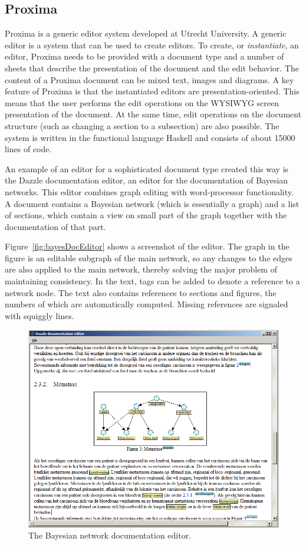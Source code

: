\documentclass[10pt]{article}
\begin{document}
\subsection{Proxima}

Proxima is a generic editor system developed at Utrecht University. A generic editor is a system that can be used to create editors. To create, or {\em instantiate}, an editor, Proxima needs to be provided with a document type and a number of sheets that describe the presentation of the document and the edit behavior. The content of a Proxima document can be mixed text, images and diagrams. A key feature of Proxima is that the instantiated editors are presentation-oriented. This means that the user performs the edit operations on the WYSIWYG screen presentation of the document. At the same time, edit operations on the document structure (such as changing a section to a subsection) are also possible. The system is written in the functional language Haskell and consists of about 15000 lines of code.

An example of an editor for a sophisticated document type created this way is the Dazzle documentation editor, an editor for the documentation of Bayesian networks. This editor combines graph editing with word-processor functionality. A document contains a Bayesian network (which is essentially a graph) and a list of sections, which contain a view on small part of the graph together with the documentation of that part. 

Figure~\ref{fig:bayesDocEditor} shows a screenshot of the editor. The graph in the figure is an editable subgraph of the main network, so any changes to the edges are also applied to the main network, thereby solving the major problem of maintaining consistency. In the text, tags can be added to denote a reference to a network node. The text also contains references to sections and figures, the numbers of which are automatically computed. Missing references are signaled with squiggly lines.

\begin{figure}[t]
\includegraphics[width=12cm]{images/subgraph}
\caption{The Bayesian network documentation editor.}
\label{fig:levelsAndLayers}
\end{figure}
\end{document}
